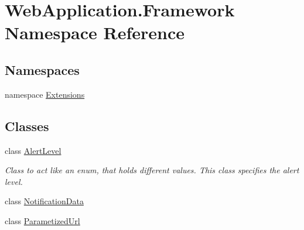 \hypertarget{namespaceWebApplication_1_1Framework}{}\section{Web\+Application.\+Framework Namespace Reference}
\label{namespaceWebApplication_1_1Framework}
\subsection*{Namespaces}
\begin{DoxyCompactItemize}
\item 
namespace \mbox{\hyperlink{namespaceWebApplication_1_1Framework_1_1Extensions}{Extensions}}
\end{DoxyCompactItemize}
\subsection*{Classes}
\begin{DoxyCompactItemize}
\item 
class \mbox{\hyperlink{classWebApplication_1_1Framework_1_1AlertLevel}{Alert\+Level}}
\begin{DoxyCompactList}\small\item\em Class to act like an enum, that holds different values. This class specifies the alert level. \end{DoxyCompactList}\item 
class \mbox{\hyperlink{classWebApplication_1_1Framework_1_1NotificationData}{Notification\+Data}}
\item 
class \mbox{\hyperlink{classWebApplication_1_1Framework_1_1ParametizedUrl}{Parametized\+Url}}
\end{DoxyCompactItemize}
